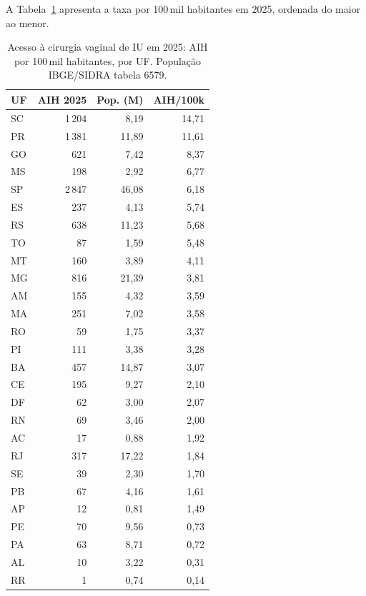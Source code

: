 \documentclass[12pt,a4paper,oneside]{article}
\begin{document}
A Tabela~\ref{tab:uf-100k} apresenta a taxa por 100\,mil
habitantes em 2025, ordenada do maior ao menor.

\begin{table}[H]
\centering
\caption{Acesso à cirurgia vaginal de IU em 2025: AIH por
100\,mil habitantes, por UF. População IBGE/SIDRA tabela 6579.}
\label{tab:uf-100k}
\small
\begin{tabular}{lrrr}
\toprule
\textbf{UF} & \textbf{AIH 2025} & \textbf{Pop. (M)} & \textbf{AIH/100k} \\
\midrule
SC          & 1\,204 &  8{,}19 & 14{,}71 \\
PR          & 1\,381 & 11{,}89 & 11{,}61 \\
GO          &   621  &  7{,}42 &  8{,}37 \\
MS          &   198  &  2{,}92 &  6{,}77 \\
SP          & 2\,847 & 46{,}08 &  6{,}18 \\
ES          &   237  &  4{,}13 &  5{,}74 \\
RS          &   638  & 11{,}23 &  5{,}68 \\
TO          &    87  &  1{,}59 &  5{,}48 \\
MT          &   160  &  3{,}89 &  4{,}11 \\
MG          &   816  & 21{,}39 &  3{,}81 \\
AM          &   155  &  4{,}32 &  3{,}59 \\
MA          &   251  &  7{,}02 &  3{,}58 \\
RO          &    59  &  1{,}75 &  3{,}37 \\
PI          &   111  &  3{,}38 &  3{,}28 \\
BA          &   457  & 14{,}87 &  3{,}07 \\
CE          &   195  &  9{,}27 &  2{,}10 \\
DF          &    62  &  3{,}00 &  2{,}07 \\
RN          &    69  &  3{,}46 &  2{,}00 \\
AC          &    17  &  0{,}88 &  1{,}92 \\
RJ          &   317  & 17{,}22 &  1{,}84 \\
SE          &    39  &  2{,}30 &  1{,}70 \\
PB          &    67  &  4{,}16 &  1{,}61 \\
AP          &    12  &  0{,}81 &  1{,}49 \\
PE          &    70  &  9{,}56 &  0{,}73 \\
PA          &    63  &  8{,}71 &  0{,}72 \\
AL          &    10  &  3{,}22 &  0{,}31 \\
RR          &     1  &  0{,}74 &  0{,}14 \\
\bottomrule
\end{tabular}
\end{table}
\end{document}
